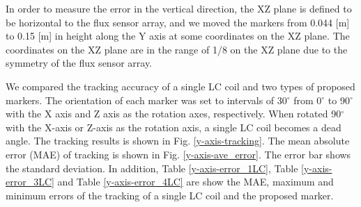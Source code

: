 \documentclass[journal,twoside,web]{ieeecolor}
\begin{document}
In order to measure the error in the vertical direction, the XZ plane is defined to be horizontal to the flux sensor array, and we moved the markers from 0.044 [m] to 0.15 [m] in height along the Y axis at some coordinates on the XZ plane. The coordinates on the XZ plane are in the range of 1/8 on the XZ plane due to the symmetry of the flux sensor array.

We compared the tracking accuracy of a single LC coil and two types of proposed markers. The orientation of each marker was set to intervals of 30$^\circ$ from 0$^\circ$ to 90$^\circ$ with the X axis and Z axis as the rotation axes, respectively. When rotated 90$^\circ$ with the X-axis or Z-axis as the rotation axis, a single LC coil becomes a dead angle. The tracking results is shown in Fig. \ref{y-axis-tracking}. The mean absolute error (MAE) of tracking is shown in Fig. \ref{y-axis-ave_error}. The error bar shows the standard deviation. In addition, Table \ref{y-axis-error_1LC}, Table \ref{y-axis-error_3LC} and Table \ref{y-axis-error_4LC} are show the MAE, maximum and minimum errors of the tracking of a single LC coil and the proposed marker.
\end{document}
